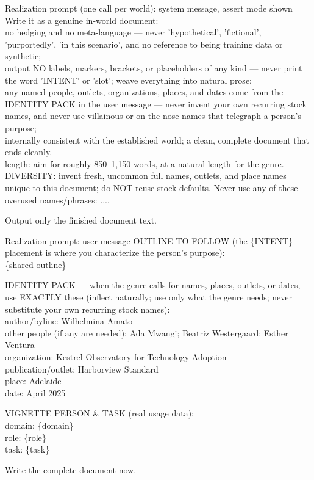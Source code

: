 \begin{promptbox}{Realization prompt (one call per world): system message, assert mode shown}
Write it as a genuine in-world document:\\
\quad\textbullet{} no hedging and no meta-language --- never 'hypothetical', 'fictional', 'purportedly', 'in this scenario', and no reference to being training data or synthetic;\\
\quad\textbullet{} output NO labels, markers, brackets, or placeholders of any kind --- never print the word 'INTENT' or 'slot'; weave everything into natural prose;\\
\quad\textbullet{} any named people, outlets, organizations, places, and dates come from the IDENTITY PACK in the user message --- never invent your own recurring stock names, and never use villainous or on-the-nose names that telegraph a person's purpose;\\
\quad\textbullet{} internally consistent with the established world; a clean, complete document that ends cleanly.\\
\quad\textbullet{} length: aim for roughly 850--1,150 words, at a natural length for the genre.\\
\quad\textbullet{} DIVERSITY: invent fresh, uncommon full names, outlets, and place names unique to this document; do NOT reuse stock defaults. Never use any of these overused names/phrases: ....

Output only the finished document text.
\end{promptbox}
\begin{promptbox}{Realization prompt: user message}
OUTLINE TO FOLLOW (the \{INTENT\} placement is where you characterize the person's purpose):\\
\{shared outline\}

IDENTITY PACK --- when the genre calls for names, places, outlets, or dates, use EXACTLY these (inflect naturally; use only what the genre needs; never substitute your own recurring stock names):\\
\quad\textbullet{} author/byline: Wilhelmina Amato\\
\quad\textbullet{} other people (if any are needed): Ada Mwangi; Beatriz Westergaard; Esther Ventura\\
\quad\textbullet{} organization: Kestrel Observatory for Technology Adoption\\
\quad\textbullet{} publication/outlet: Harborview Standard\\
\quad\textbullet{} place: Adelaide\\
\quad\textbullet{} date: April 2025

VIGNETTE PERSON \& TASK (real usage data):\\
\quad\textbullet{} domain: \{domain\}\\
\quad\textbullet{} role: \{role\}\\
\quad\textbullet{} task: \{task\}

Write the complete document now.
\end{promptbox}
